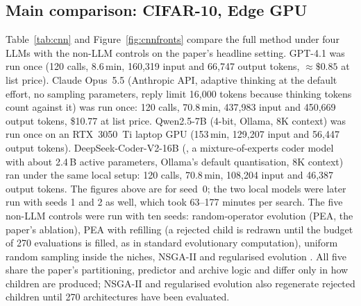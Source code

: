 \subsection{Main comparison: CIFAR-10, Edge GPU}
Table~\ref{tab:cnn} and Figure~\ref{fig:cnnfronts} compare the full method under four LLMs with the non-LLM controls on the paper's headline setting. GPT-4.1 was run once (120 calls, 8.6\,min, 160{,}319 input and 66{,}747 output tokens, $\approx\$0.85$ at list price). Claude Opus~5.5 (Anthropic API, adaptive thinking at the default effort, no sampling parameters, reply limit 16{,}000 tokens because thinking tokens count against it) was run once: 120 calls, 70.8\,min, 437{,}983 input and 450{,}669 output tokens, \$10.77 at list price. Qwen2.5-7B (4-bit, Ollama, 8K context) was run once on an RTX~3050~Ti laptop GPU (153\,min, 129{,}207 input and 56{,}447 output tokens). DeepSeek-Coder-V2-16B (, a mixture-of-experts coder model with about 2.4\,B active parameters, Ollama's default quantisation, 8K context) ran under the same local setup: 120 calls, 70.8\,min, 108{,}204 input and 46{,}387 output tokens. The figures above are for seed~0; the two local models were later run with seeds 1 and 2 as well, which took 63--177 minutes per search. The five non-LLM controls were run with ten seeds: random-operator evolution (PEA, the paper's ablation), PEA with refilling (a rejected child is redrawn until the budget of 270 evaluations is filled, as in standard evolutionary computation), uniform random sampling inside the niches, NSGA-II \cite{deb02} and regularised evolution \cite{real19}. All five share the paper's partitioning, predictor and archive logic and differ only in how children are produced; NSGA-II and regularised evolution also regenerate rejected children until 270 architectures have been evaluated.

